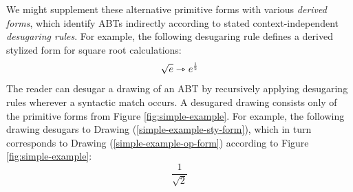 We might supplement these alternative primitive forms with various \emph{derived forms}, which  identify ABTs indirectly according to stated context-independent \emph{desugaring rules}. For example, the following desugaring rule defines a derived stylized form for square root calculations:
\begin{equation}\label{rule:simplelang-sqrt}
\sqrt{e} \rightarrowtriangle e^{\frac{\numintro{1}}{\numintro{2}}}
\end{equation}
The reader can desugar a drawing of an ABT by recursively applying desugaring rules wherever a syntactic match occurs. A desugared drawing consists only of the {primitive forms} from Figure \ref{fig:simple-example}. 
For example, the following drawing desugars to Drawing (\ref{simple-example-sty-form}), which in turn corresponds to Drawing (\ref{simple-example-op-form}) according to Figure \ref{fig:simple-example}:
\begin{subequations}[resume]
\begin{equation}\label{simple-example-derived-form}
\frac{1}{\sqrt{2}}
\end{equation}
\end{subequations}


